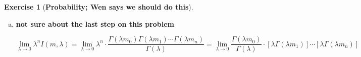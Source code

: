 \documentclass{article}
\theoremstyle{definition}
\newtheorem{exercise}{Exercise}
\theoremstyle{definition}
\theoremstyle{definition}
\theoremstyle{definition}
\begin{document}
\begin{exercise}[\textbf{Probability; Wen says we should do this}]
\begin{enumerate}[(a)]
\[
=  \int_{x_{n+1}=0}^1   \int_{x_{n}=0}^1 \cdots \int_{x_1=0}^1  \prod_{i=1}^{n} \left( \frac{1}{x_i} - \frac{1}{n+1} \right)^{\lambda m_i - 1}  \left( \sum_{i=1}^{n+1} \frac{1}{x_i}  \right)^{-\lambda} \prod_{i=1}^{n} x_i^{-2}  \ dx_1 \cdots dx_n
\]

\begin{equation}
\cdot  \left( \frac{1}{x_{n+1}} - \frac{1}{n+1} \right)^{\lambda m_{n+1} - 1} x_{n+1}^{-2}  \ dx_{n+1}
\end{equation}


We can rewrite the left side of the inductive hypothesis (\ref{2017.screen.3.a.inductive.hypothesis}) using analagous substitutions as 

\[
\int_{\mathbb{R}^n} \exp \left( \lambda \left[ \sum_{i=1}^n \theta_i x_i \right] \right) \left(1 + \sum_{i=1}^n \exp(\theta_i) \right)^{-\lambda} \ d\theta =  \int_{\mathbb{R}_+^n} \prod_{i=1}^n u_i^{\lambda m_i} \left(1 + \sum_{i=1}^n u_i \right)^{-\lambda} \prod_{i=1}^n u_i^{-1} \ du
\]

\[
 =    \int_{x_{n}=1}^0 \cdots \int_{x_1=1}^0  \prod_{i=1}^n \left( \frac{1}{x_i} - \frac{1}{n}  \right) ^{\lambda m_i - 1} \left(1 + \sum_{i=1}^n  \left[ \frac{1}{x_i} - \frac{1}{n}  \right] \right)^{-\lambda} \prod_{i=1}^n -x_i^{-2} \ dx_1 \cdots dx_n
\]

\[
 =    \int_{x_{n}=0}^1 \cdots \int_{x_1=0}^1  \prod_{i=1}^n \left( \frac{1}{x_i} - \frac{1}{n}  \right) ^{\lambda m_i - 1} \left(\sum_{i=1}^n   \frac{1}{x_i}  \right)^{-\lambda} \prod_{i=1}^n x_i^{-2} \ dx_1 \cdots dx_n
\]


\[
\vdots
\]

\[
\ldots =  \frac{\Gamma(\lambda m_0) \Gamma(\lambda m_1) \cdots \Gamma(\lambda m_{n+1})}{\Gamma(\lambda)}.
\]

\item \textbf{not sure about the last step on this problem}

\[
\lim_{\lambda \to 0} \lambda^n I(m, \lambda) = \lim_{\lambda \to 0} \lambda^n \cdot   \frac{\Gamma(\lambda m_0) \Gamma(\lambda m_1) \cdots \Gamma(\lambda m_n)}{\Gamma(\lambda)} = \lim_{\lambda \to 0}  \frac{ \Gamma(\lambda m_0) }{\Gamma(\lambda)} \cdot  [\lambda  \Gamma(\lambda m_1)] \cdots[ \lambda \Gamma(\lambda m_n)]
\]


\end{enumerate}
\end{exercise}
\end{document}
